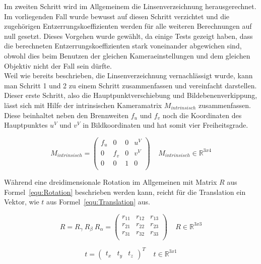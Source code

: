 \begin{description}
Im zweiten Schritt wird im Allgemeinem die Linsenverzeichnung herausgerechnet. Im vorliegenden Fall wurde bewusst auf diesen Schritt verzichtet und die zugehörigen Entzerrungskoeffizienten werden für alle weiteren Berechnungen auf null gesetzt. Dieses Vorgehen wurde gewählt, da einige Tests gezeigt haben, dass die berechneten Entzerrungskoeffizienten stark voneinander abgewichen sind, obwohl dies beim Benutzen der gleichen Kameraeinstellungen und dem gleichen Objektiv nicht der Fall sein dürfte.\\
Weil wie bereits beschrieben, die Linsenverzeichnung vernachlässigt wurde, kann man Schritt 1 und 2 zu einem Schritt zusammenfassen und vereinfacht darstellen. Dieser erste Schritt, also die Hauptpunktverschiebung und Bildebenenverkippung, lässt sich mit Hilfe der intrinsischen Kameramatrix $M_{intrinsisch}$ zusammenfassen. Diese beinhaltet neben den Brennweiten $f_u$ und $f_v$ noch die Koordinaten des Hauptpunktes $u^V$ und $v^V$ in Bildkoordinaten und hat somit vier Freiheitsgrade.

\begin{equation}
\label{equ:intrinsic}
M_{intrinsisch} = 
\begin{pmatrix}
f_u & 0 & 0 & u^V \\
0 & f_v & 0 & v^V\\
0 & 0 & 1 & 0 \\
\end{pmatrix} 
~ ~ ~ ~ ~M_{intrinsisch} \in \mathbb{R}^{3x4}
\end{equation}

Während eine dreidimensionale Rotation im Allgemeinen mit Matrix $R$ aus Formel~\ref{equ:Rotation} beschrieben werden kann, reicht für die Translation ein Vektor, wie $t$ aus Formel~\ref{equ:Translation} aus.\

\begin{equation}
\label{equ:Rotation}
R= R_\gamma ~R_\beta ~R_\alpha =
\begin{pmatrix}
r_{11} & r_{12} & r_{13} \\
r_{21} & r_{22} & r_{23} \\
r_{31} & r_{32} & r_{33} \\
\end{pmatrix}
~ ~ ~ ~ ~R \in \mathbb{R}^{3x3}
\end{equation}

\begin{equation}
\label{equ:Translation}
t=
\begin{pmatrix}
t_x & t_y & t_z
\end{pmatrix}^T
~ ~ ~ ~ ~t \in \mathbb{R}^{3x1} 
\end{equation}


\end{description}
